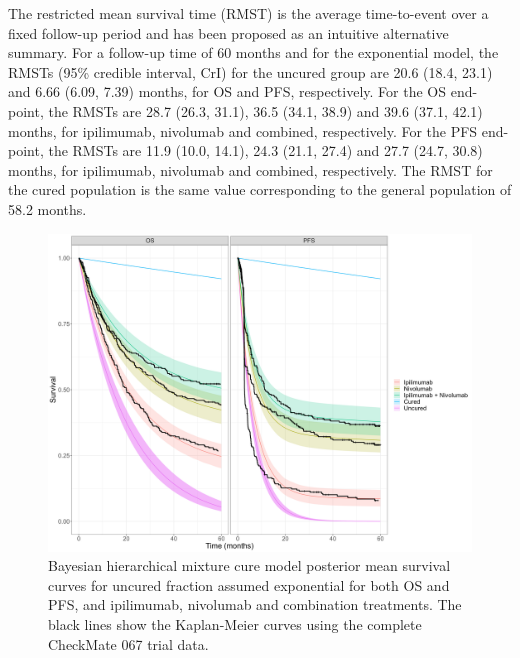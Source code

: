 \documentclass[AMA,STIX1COL]{WileyNJD-v2}
\begin{document}
The restricted mean survival time (RMST) is the average time-to-event over a fixed follow-up period and has been proposed as an intuitive alternative summary.
For a follow-up time of 60 months and for the exponential model, the RMSTs (95\% credible interval, CrI) for the uncured group are 20.6 (18.4, 23.1) and 6.66 (6.09, 7.39) months, for OS and PFS, respectively. 
For the OS end-point, the RMSTs are 28.7 (26.3, 31.1), 36.5 (34.1, 38.9) and 39.6 (37.1, 42.1) months, for ipilimumab, nivolumab and combined, respectively.
For the PFS end-point, the RMSTs are 11.9 (10.0, 14.1), 24.3 (21.1, 27.4) and 27.7 (24.7, 30.8) months, for ipilimumab, nivolumab and combined, respectively.
The RMST for the cured population is the same value corresponding to the general population of 58.2 months.



\begin{figure}[!ht]
\centering
\includegraphics[width=0.7\linewidth]{bmcm_stan_exp_exp_S_plot.png}
\caption{\label{fig:S_exp_cf_hier} Bayesian hierarchical mixture cure model posterior mean survival curves for uncured fraction assumed exponential for both OS and PFS, and ipilimumab, nivolumab and combination treatments. The black lines show the Kaplan-Meier curves using the complete CheckMate 067 trial data.}
\end{figure}
\end{document}
